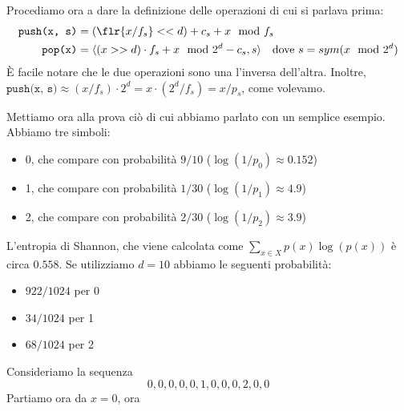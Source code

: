 Procediamo ora a dare la definizione delle operazioni di cui si parlava prima:
\begin{align*}
	\texttt{push(x, s)} & = (\flr{x / f_s} << d) + c_s + x \mod f_s                                                                \\
	\texttt{pop(x)}     & = \langle (x >> d) \cdot f_s + x \mod 2^d - c_s, s \rangle \quad \textnormal{dove $s = sym(x \mod 2^d)$}
\end{align*}
È facile notare che le due operazioni sono una l'inversa dell'altra. Inoltre, $\texttt{push(x, s)} \approx (x / f_s) \cdot 2^d = x \cdot (2^d / f_s) = x / p_s$, come volevamo.

Mettiamo ora alla prova ciò di cui abbiamo parlato con un semplice esempio. Abbiamo tre simboli:
\begin{itemize}
	\item 0, che compare con probabilità $9 / 10$ ($\log(1/p_0) \approx 0.152$)
	\item 1, che compare con probabilità $1 / 30$ ($\log(1/p_1) \approx 4.9$)
	\item 2, che compare con probabilità $2 / 30$ ($\log(1/p_2) \approx 3.9$)
\end{itemize}
L'entropia di Shannon, che viene calcolata come $\sum_{x \in X}p(x) \log(p(x))$ è circa $0.558$. Se utilizziamo $d = 10$ abbiamo le seguenti probabilità:
\begin{itemize}
	\item $922 / 1024$ per 0
	\item $34 / 1024$ per 1
	\item $68 / 1024$ per 2
\end{itemize}
Consideriamo la sequenza
\begin{equation}
	0, 0, 0, 0, 0, 1, 0, 0, 0, 2, 0, 0
\end{equation}
Partiamo ora da $x = 0$, ora
